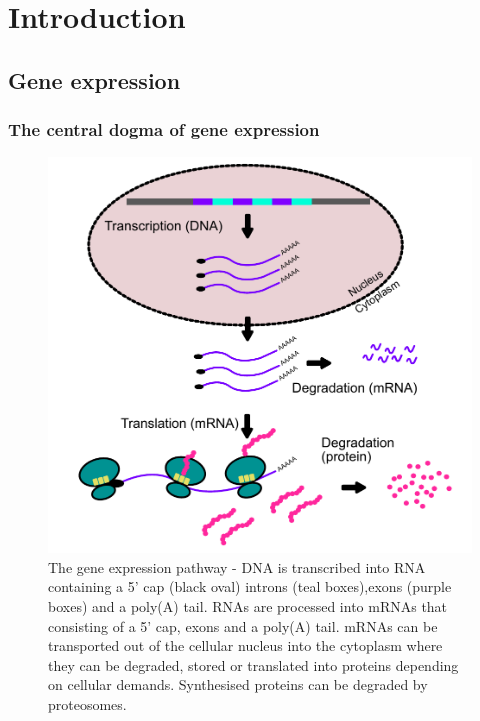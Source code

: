 \documentclass[
  12pt,
  openany]{book}
\begin{document}
\setcounter{page}{1}

\chapter{Introduction}
\section{Gene expression}
\subsection{The central dogma of gene expression}
  \begin{figure}
  \includegraphics{./figures/geneExprPath_2.pdf}
  \caption{The gene expression pathway - DNA is transcribed into RNA containing a 5' cap (black oval) introns (teal boxes),exons (purple boxes) and a poly(A) tail. RNAs are processed into mRNAs that consisting of a 5' cap, exons and a poly(A) tail. mRNAs can be transported out of the cellular nucleus into the cytoplasm where they can be degraded, stored or translated into proteins depending on cellular demands. Synthesised proteins can be degraded by proteosomes. \label{fig:geneExprPath}}
\end{figure}
\end{document}
